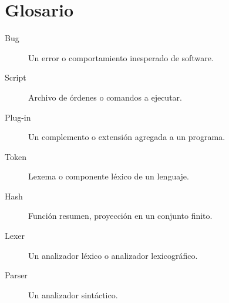 \chapter{Glosario}

\begin{description}
  \item [Bug] Un error o comportamiento inesperado de software.

  \item [Script] Archivo de órdenes o comandos a ejecutar.

  \item [Plug-in] Un complemento o extensión agregada a un programa.

  \item [Token] Lexema o componente léxico de un lenguaje.
  
  \item [Hash] Función resumen, proyección en un conjunto finito.
  
  \item [Lexer] Un analizador léxico o analizador lexicográfico.
  
  \item [Parser] Un analizador sintáctico.
\end{description}
